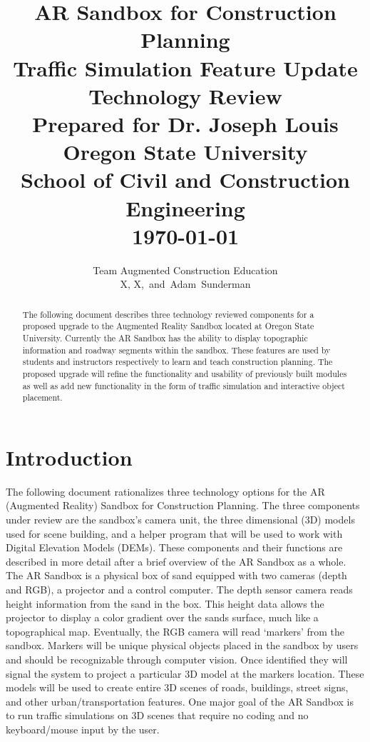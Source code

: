 \documentclass[letterpaper, 10pt, onecolumn, draftclsnofoot]{IEEEtran}
\begin{document}
\title{
    \Large{\textbf{AR Sandbox for Construction Planning \\
                   Traffic Simulation Feature Update}} \\
    \small{Technology Review} \\
    \vspace{15pt}
    \large{Prepared for Dr. Joseph Louis \\
    Oregon State University \\
    School of Civil and Construction Engineering \\
    \today}
    }

\author{Team Augmented Construction Education \\
       X, X,~and~Adam~Sunderman}
        
\maketitle
\vspace{200pt}
\begin{abstract}
    The following document describes three technology reviewed components for a proposed upgrade to the Augmented Reality Sandbox located at Oregon State University. Currently the AR Sandbox has the ability to display topographic information and roadway segments within the sandbox. These features are used by students and instructors respectively to learn and teach construction planning. The proposed upgrade will refine the functionality and usability of previously built modules as well as add new functionality in the form of traffic simulation and interactive object placement.
\end{abstract}
\newpage
\section{Introduction}
The following document rationalizes three technology options for the AR (Augmented Reality) Sandbox for Construction Planning. The three components under review are the sandbox's camera unit, the three dimensional (3D) models used for scene building, and a helper program that will be used to work with Digital Elevation Models (DEMs). These components and their functions are described in more detail after a brief overview of the AR Sandbox as a whole.\\ 
The AR Sandbox is a physical box of sand equipped with two cameras (depth and RGB), a projector and a control computer. The depth sensor camera reads height information from the sand in the box. This height data allows the projector to display a color gradient over the sands surface, much like a topographical map. Eventually, the RGB camera will read ‘markers’ from the sandbox. Markers will be unique physical objects placed in the sandbox by users and should be recognizable through computer vision. Once identified they will signal the system to project a particular 3D model at the markers location. These models will be used to create entire 3D scenes of roads, buildings, street signs, and other urban/transportation features. One major goal of the AR Sandbox is to run traffic simulations on 3D scenes that require no coding and no keyboard/mouse input by the user.
\end{document}
